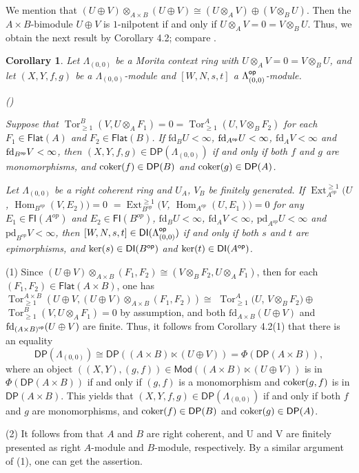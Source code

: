 \documentclass[10pt,twoside]{amsart}
\theoremstyle{bfupright head,slanted body}
\theoremstyle{bfupright head,upright body}
\theoremstyle{fixed bf head,slanted body}
\newtheorem{cor}[res]{Corollary}        \newtheorem*{cor*}{Corollary}
\theoremstyle{fixed bf head,upright body}
\theoremstyle{numbered paragraph}
\newlength{\thmlistleft}        %
\newlength{\thmlistright}       %
\newlength{\thmlistpartopsep}   %
\newlength{\thmlisttopsep}      %
\newlength{\thmlistparsep}      %
\newlength{\thmlistitemsep}     %
\newcounter{rqm}
\newenvironment{rqm}{\begin{list}{\upshape (\arabic{rqm})}%
    {\usecounter{rqm}%
      \setlength{\leftmargin}{\thmlistleft}%
      \setlength{\labelwidth}{\thmlistleft}%
      \setlength{\rightmargin}{\thmlistright}%
      \setlength{\partopsep}{\thmlistpartopsep}%
      \setlength{\topsep}{\thmlisttopsep}%
      \setlength{\parsep}{\thmlistparsep}%
      \setlength{\itemsep}{\thmlistitemsep}}}%
  {\end{list}}%
\newenvironment{prf*}[1][Proof]{%
  \begin{proof}[\bf #1]
    \setcounter{equation}{0}
    \renewcommand{\theequation}{\arabic{equation}}}
  {\end{proof}
  }
\numberwithin{equation}{res}
\newcommand{\DP}{\mathsf{DP}}
\newcommand{\DI}{\mathsf{DI}}
\newcommand{\fd}{\mathrm{fd}}
\newcommand{\pd}{\mathrm{pd}}
\newcommand{\Flat}{\mathsf{Flat}}
\newcommand{\FI}{\mathsf{FI}}
\newcommand{\Mod}{\mathsf{Mod}}
\newcommand{\op}{\sf op}
\newcommand{\cok}{\mbox{\rm coker}}
\newcommand{\kernel}{\mbox{\rm ker}}
\newcommand{\Hom}{\operatorname{Hom}}
\newcommand{\Ext}{\operatorname{Ext}}
\newcommand{\Tor}{\operatorname{Tor}}
\begin{document}
We mention that $(U \oplus V)\otimes_{A\times B}(U \oplus V) \cong (U\otimes_AV) \oplus (V\otimes_BU)$.
Then the $A\times B$-bimodule $U \oplus V$ is $1$-nilpotent if and only if $U\otimes_AV=0=V\otimes_BU$.
Thus, we obtain the next result by Corollary 4.2; compare \cite[Theorem 2.4 and 3.5]{2023Mao}.



\begin{cor} \label{con GP in morita ring}
Let $\Lambda_{(0,0)}$ be a Morita context ring with $U\otimes_AV=0=V\otimes_BU$, and let $(X,Y,f,g)$ be a $\Lambda_{(0,0)}$-module and $[W,N,s,t]$ a $\Lambda_{(0,0)}^{\op}$-module.
\begin{rqm}
\item
Suppose that $\Tor^B_{\geqslant 1}(V, U\otimes_A F_1)=0=\Tor^A_{\geqslant 1}(U, V\otimes_B F_2)$ for each $F_1 \in \Flat(A)$ and $F_2 \in \Flat(B)$. If $\fd_{B}U<\infty$, $\fd_{A^{\op}}U<\infty$, $\fd_{A}V<\infty$ and $\fd_{B^{\op}}V< \infty$, then $(X,Y,f,g)\in\DP(\Lambda_{(0,0)})$ if and only if
both $f$ and $g$ are monomorphisms, and $\cok(f)\in\DP(B)$ and $\cok(g)\in\DP(A)$. 
\item
Let $\Lambda_{(0,0)}$ be a right coherent ring and $U_{A}$, $V_{B}$ be finitely generated.
If $\Ext_{A^{op}}^{\geqslant 1}(U$, $\Hom_{B^{op}}(V, E_{2}))=0 $ 
$=\Ext_{B^{op}}^{\geqslant 1}(V$, $\Hom_{A^{op}}(U, E_{1}))=0 $
for any $E_{1}\in\FI(A^{op})$ and  $E_{2}\in\FI(B^{op})$, 
$\fd_{B}U<\infty$, $\fd_{A}V<\infty$, $\pd_{A^{op}}U<\infty$ and $\pd_{B^{op}}V<\infty$,
then $[W,N,s,t]\in\DI(\Lambda_{(0,0)}^{\op})$ if and only if both $s$ and $t$ are epimorphisms, and $\kernel(s)\in\DI(B^{\op})$ and $\kernel(t)\in\DI(A^{\op})$.
\end{rqm}
\end{cor}
\begin{prf*}
(1) Since $(U \oplus V)\otimes_{A\times B}(F_{1}, F_{2}) \cong (V\otimes_B F_{2},U\otimes_A F_{1})$,
then for each $(F_1, F_2) \in \Flat(A\times B)$, one has $\Tor^{A\times B}_{\geqslant 1}
(U \oplus V, (U \oplus V)\otimes_{A\times B}(F_1, F_2)) \cong$
$\Tor^{A}_{\geqslant 1}(U$, $V\otimes_B F_{2})\oplus$ $\Tor^{B}_{\geqslant 1}(V, U\otimes_A F_{1}) =0$
by assumption, and both $\fd_{A\times B}(U \oplus V)$ and $\fd_{{(A\times B)}^{\op}}(U \oplus V)$ are finite. 
Thus, it follows from Corollary 4.2(1) that there is an equality
$$
\DP(\Lambda_{(0,0)})
\cong \DP((A\times B)\ltimes (U \oplus V))
=\Phi(\DP(A\times B)),$$
where an object $((X,Y),(g,f))\in\Mod((A\times B)\ltimes (U \oplus V))$ is in $\Phi(\DP(A\times B))$ if and only if $(g,f)$ is a monomorphism and $\cok(g,f)$ is in $\DP(A\times B)$. This yields that $(X,Y,f,g)\in\DP(\Lambda_{(0,0)})$ if and only if
both $f$ and $g$ are monomorphisms, and $\cok(f)\in\DP(B)$ and $\cok(g)\in\DP(A)$.

(2) It follows from \cite[Corollary 4.7]{DL} that $A$ and $B$ are right coherent, 
and U and V are finitely presented as right $A$-module and $B$-module, respectively.
By a similar argument of (1), one can get the assertion.
\end{prf*}
\end{document}
